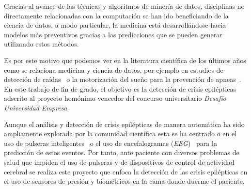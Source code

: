 
Gracias al avance de las técnicas y algoritmos de minería de datos, disciplinas no directamente relacionadas con la computación se han ido beneficiando de la ciencia de datos, a modo particular, la medicina está desarrollándose hacia modelos más preventivos gracias a las predicciones que se pueden generar utilizando estos métodos.

Es por este motivo que podemos ver en la literatura científica de los últimos años como se relaciona medicina y ciencia de datos, por ejemplo en estudios de detección de caídas~\cite{tolkiehn2011fall} o la motorización del sueño para la prevención de apneas~\cite{kortelainen2012sleepmonitoring}. En este trabajo de fin de grado, el objetivo es la detección de crisis epilépticas adscrito al proyecto homónimo vencedor del concurso universitario \textit{Desafío Universidad Empresa}~\cite{radio:radio_amiga_burgos_2018}

Aunque el análisis y detección de crisis epilépticas de manera automática ha sido ampliamente explorada por la comunidad científica esta se ha centrado o en el uso de pulseras inteligentes~\cite{ramgopal2014product_review} o el uso de encefalogramas (\textit{EEG})~\cite{jeppesen2017modified,kumar2014epilepticeeg,tzallas2012review} para la predicción de estos eventos. Por tanto, ante paciente con diversos problemas de salud que impiden el uso de pulseras y de dispositivos de control de actividad cerebral se realiza este proyecto que enfoca la detección de las crisis epilépticas en el uso de sensores de presión y biométricos en la cama donde duerme el paciente.